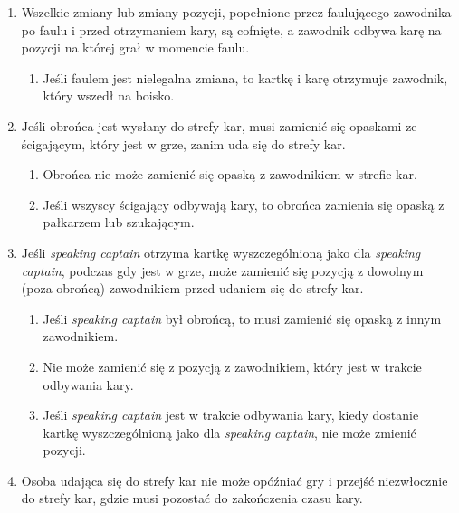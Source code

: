 \documentclass[11pt,a4paper]{article}
\begin{document}
\begin{enumerate}

\item
  Wszelkie zmiany lub zmiany pozycji, popełnione przez faulującego
  zawodnika po faulu i przed otrzymaniem kary, są cofnięte, a zawodnik
  odbywa karę na pozycji na której grał w momencie faulu.

  \begin{enumerate}
  
  \item
    Jeśli faulem jest nielegalna zmiana, to kartkę i karę otrzymuje
    zawodnik, który wszedł na boisko.
  \end{enumerate}
\item
  Jeśli obrońca jest wysłany do strefy kar, musi zamienić się opaskami
  ze ścigającym, który jest w grze, zanim uda się do strefy kar.

  \begin{enumerate}
  
  \item
    Obrońca nie może zamienić się opaską z zawodnikiem w strefie kar.
  \item
    Jeśli wszyscy ścigający odbywają kary, to obrońca zamienia się
    opaską z pałkarzem lub szukającym.
  \end{enumerate}
\item
  Jeśli \emph{speaking captain} otrzyma kartkę wyszczególnioną jako dla
  \emph{speaking captain}, podczas gdy jest w grze, może zamienić się
  pozycją z dowolnym (poza obrońcą) zawodnikiem przed udaniem się do
  strefy kar.

  \begin{enumerate}
  
  \item
    Jeśli \emph{speaking captain} był obrońcą, to musi zamienić się
    opaską z innym zawodnikiem.
  \item
    Nie może zamienić się z pozycją z zawodnikiem, który jest w trakcie
    odbywania kary.
  \item
    Jeśli \emph{speaking captain} jest w trakcie odbywania kary, kiedy
    dostanie kartkę wyszczególnioną jako dla \emph{speaking captain},
    nie może zmienić pozycji.
  \end{enumerate}
\item
  Osoba udająca się do strefy kar nie może opóźniać gry i przejść
  niezwłocznie do strefy kar, gdzie musi pozostać do zakończenia czasu
  kary.

  \begin{enumerate}
  

\end{enumerate}
\end{enumerate}
\end{document}
